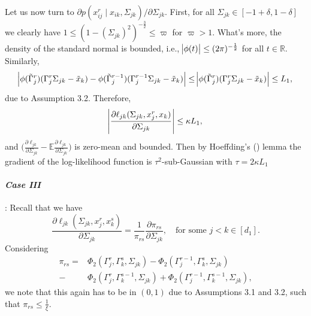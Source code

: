 \begin{condition}
    Let us now turn to $\partial p(x_{ij}^{r} \mid x_{ik}, \Sigma_{jk})/\partial \Sigma_{jk}$. First, for all $\Sigma_{jk} \in [-1+\delta, 1-\delta]$ we clearly have $1 \leq (1-(\Sigma_{jk})^2)^{-\frac{3}{2}} \leq \varpi$ for $\varpi > 1$. What's more, the density of the standard normal is bounded, i.e., $\abs{\phi(t)} \leq (2\pi)^{-\frac{1}{2}}$ for all $t \in \mathbb{R}$. Similarly,
    \begin{equation*}
        \abs{\phi({\tilde{\Gamma}}_j^{r})({\Gamma}_j^r\Sigma_{jk} - {\tilde{x}}_{k}) - \phi({\tilde{\Gamma}}_j^{r-1})({\Gamma}_j^{r-1}\Sigma_{jk} - {\tilde{x}}_{k})} \leq  \abs{\phi({\tilde{\Gamma}}_j^{r})({\Gamma}_j^r\Sigma_{jk} - {\tilde{x}}_{k})} \leq L_1,
    \end{equation*}
    due to Assumption 3.2. %
    Therefore,
    \begin{equation*}
        \abs{\frac{\partial\ell_{jk}(\Sigma_{jk}, x_j^r,x_k)}{\partial \Sigma_{jk}}} \leq \kappa L_1,
    \end{equation*}
    and $\Big(\frac{\partial\ell_{jk}}{\partial \Sigma_{jk}} - \mathbb{E}\frac{\partial\ell_{jk}}{\partial \Sigma_{jk}} \Big)$ is zero-mean and bounded. Then by Hoeffding's (\citeyear{Hoeffding63}) lemma  the gradient of the log-likelihood function is $\tau^2$-sub-Gaussian with $\tau = 2\kappa L_1$

    \paragraph{\textit{Case III}}: Recall that we have
    \begin{equation*}
        \frac{\partial \ell_{jk}(\Sigma_{jk}, x_j^r,x_k^s)}{\partial \Sigma_{jk}} = \frac{1}{\pi_{rs}} \frac{\partial \pi_{rs}}{\partial \Sigma_{jk}}, \quad \text{for some }j<k \in [d_1].
    \end{equation*}
    Considering
    \begin{align*}
        \pi_{rs} = & \Phi_2({\Gamma}_j^r, {\Gamma}_k^s, \Sigma_{jk}) - \Phi_2({\Gamma}_j^{r-1}, {\Gamma}_k^s, \Sigma_{jk})          \\
        -          & \Phi_2({\Gamma}_j^r, {\Gamma}_k^{s-1}, \Sigma_{jk}) + \Phi_2({\Gamma}_j^{r-1}, {\Gamma}_k^{s-1}, \Sigma_{jk}),
    \end{align*}
    we note that this again has to be in $(0,1)$ due to Assumptions 3.1 and 3.2,
    such that $\pi_{rs} \leq \frac{1}{\xi}$. %


\end{condition}
